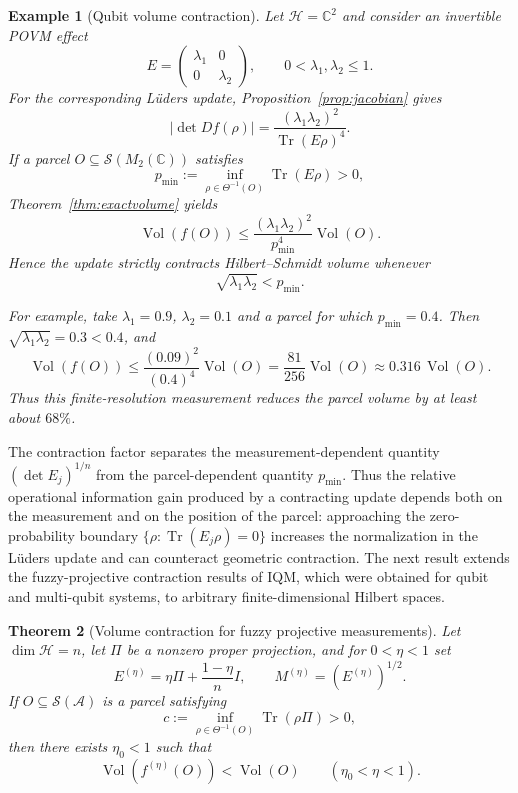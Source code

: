 \documentclass[11pt]{article}
\newtheorem{theorem}{Theorem}[section]
\newtheorem{example}[theorem]{Example}
\begin{document}
\begin{example}[Qubit volume contraction]
\label{ex:qubit-volume}
Let $\mathcal H=\mathbb C^2$ and consider an invertible POVM effect
\[
E=
\begin{pmatrix}
\lambda_1&0\\
0&\lambda_2
\end{pmatrix},
\qquad
0<\lambda_1,\lambda_2\leq1.
\]
For the corresponding L\"uders update, Proposition~\ref{prop:jacobian}
gives
\[
\left|\det Df(\rho)\right|
=
\frac{(\lambda_1\lambda_2)^2}
     {\operatorname{Tr}(E\rho)^4}.
\]
If a parcel $O\subseteq\mathcal S(M_2(\mathbb C))$ satisfies
\[
p_{\min}
:=
\inf_{\rho\in\Theta^{-1}(O)}
\operatorname{Tr}(E\rho)>0,
\]
Theorem~\ref{thm:exactvolume} yields
\[
\operatorname{Vol}(f(O))
\leq
\frac{(\lambda_1\lambda_2)^2}{p_{\min}^4}
\operatorname{Vol}(O).
\]
Hence the update strictly contracts Hilbert--Schmidt volume whenever
\[
\sqrt{\lambda_1\lambda_2}<p_{\min}.
\]

For example, take $\lambda_1=0.9$, $\lambda_2=0.1$ and a parcel for
which $p_{\min}=0.4$. Then
$\sqrt{\lambda_1\lambda_2}=0.3<0.4$, and
\[
\operatorname{Vol}(f(O))
\leq
\frac{(0.09)^2}{(0.4)^4}\operatorname{Vol}(O)
=
\frac{81}{256}\operatorname{Vol}(O)
\approx0.316\,\operatorname{Vol}(O).
\]
Thus this finite-resolution measurement reduces the parcel volume by
at least about $68\%$.
\end{example}

 The contraction factor separates the measurement-dependent quantity
$(\det E_j)^{1/n}$ from the parcel-dependent quantity $p_{\min}$. Thus
the relative operational information gain produced by a contracting
update depends both on the measurement and on the position of the parcel:
approaching the zero-probability boundary
$\{\rho:\operatorname{Tr}(E_j\rho)=0\}$ increases the normalization in
the L\"uders update and can counteract geometric contraction.
The next result extends the fuzzy-projective contraction results of
IQM, which were obtained for qubit and multi-qubit systems, to arbitrary
finite-dimensional Hilbert spaces.
\begin{theorem}[Volume contraction for fuzzy projective measurements]
\label{thm:volumecontraction}
Let $\dim\mathcal H=n$, let $\Pi$ be a nonzero proper projection, and for
$0<\eta<1$ set
\[
E^{(\eta)}
=
\eta\Pi+\frac{1-\eta}{n}I,
\qquad
M^{(\eta)}=(E^{(\eta)})^{1/2}.
\]
If $O\subseteq\mathcal S(\mathcal A)$ is a parcel satisfying
\[
c:=
\inf_{\rho\in\Theta^{-1}(O)}
\operatorname{Tr}(\rho\Pi)>0,
\]
then there exists $\eta_0<1$ such that
\[
\operatorname{Vol}(f^{(\eta)}(O))
<
\operatorname{Vol}(O)
\qquad(\eta_0<\eta<1).
\]
\end{theorem}
\end{document}
